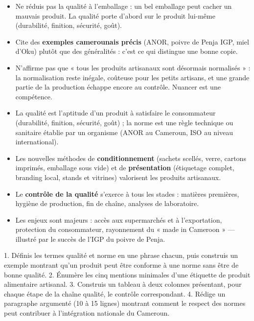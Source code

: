\documentclass[11pt]{article}
\newcommand{\cle}[1]{{\popxbold\color{popdark}#1}}
\begin{document}
\begin{attention}
\begin{itemize}
\item Ne réduis pas la qualité à l'emballage : un bel emballage peut cacher un mauvais produit. La qualité porte d'abord sur le produit lui-même (durabilité, finition, sécurité, goût).
\item Cite des \textbf{exemples camerounais précis} (ANOR, poivre de Penja IGP, miel d'Oku) plutôt que des généralités : c'est ce qui distingue une bonne copie.
\item N'affirme pas que « tous les produits artisanaux sont désormais normalisés » : la normalisation reste inégale, coûteuse pour les petits artisans, et une grande partie de la production échappe encore au contrôle. Nuancer est une compétence.
\end{itemize}
\end{attention}

\begin{aretenir}
\begin{itemize}
\item La \cle{qualité} est l'aptitude d'un produit à satisfaire le consommateur (durabilité, finition, sécurité, goût) ; la \cle{norme} est une règle technique ou sanitaire établie par un organisme (ANOR au Cameroun, ISO au niveau international).
\item Les nouvelles méthodes de \textbf{conditionnement} (sachets scellés, verre, cartons imprimés, emballage sous vide) et de \textbf{présentation} (étiquetage complet, branding local, stands et vitrines) valorisent les produits artisanaux.
\item Le \textbf{contrôle de la qualité} s'exerce à tous les stades : matières premières, hygiène de production, fin de chaîne, analyses de laboratoire.
\item Les enjeux sont majeurs : accès aux supermarchés et à l'exportation, protection du consommateur, rayonnement du « made in Cameroon » — illustré par le succès de l'IGP du poivre de Penja.
\end{itemize}
\end{aretenir}

\begin{exercice}
1. Définis les termes \cle{qualité} et \cle{norme} en une phrase chacun, puis construis un exemple montrant qu'un produit peut être conforme à une norme sans être de bonne qualité.
2. Énumère les cinq mentions minimales d'une étiquette de produit alimentaire artisanal.
3. Construis un tableau à deux colonnes présentant, pour chaque étape de la chaîne qualité, le contrôle correspondant.
4. Rédige un paragraphe argumenté (10 à 15 lignes) montrant comment le respect des normes peut contribuer à l'intégration nationale du Cameroun.
\end{exercice}
\end{document}
